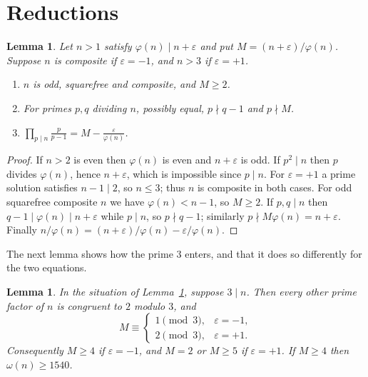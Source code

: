 \documentclass[screen,reqno]{aomart}
\numberwithin{equation}{section}
\theoremstyle{plain}
\newtheorem{lemma}[theorem]{Lemma}
\theoremstyle{definition}
\theoremstyle{remark}
\begin{document}
\section{Reductions}\label{sec:elem}

\begin{lemma}\label{lem:basic}
Let $n>1$ satisfy $\varphi(n)\mid n+\varepsilon$ and put
$M=(n+\varepsilon)/\varphi(n)$. Suppose $n$ is composite if
$\varepsilon=-1$, and $n>3$ if $\varepsilon=+1$.
\begin{enumerate}[label=\textup{(\roman*)}]
\item $n$ is odd, squarefree and composite, and $M\ge2$.
\item For primes $p,q$ dividing $n$, possibly equal, $p\nmid q-1$ and
  $p\nmid M$.
\item $\displaystyle\prod_{p\mid n}\frac{p}{p-1}
  =M-\frac{\varepsilon}{\varphi(n)}$.
\end{enumerate}
\end{lemma}

\begin{proof}
If $n>2$ is even then $\varphi(n)$ is even and $n+\varepsilon$ is odd.
If $p^2\mid n$ then $p$ divides $\varphi(n)$, hence $n+\varepsilon$,
which is impossible since $p\mid n$. For $\varepsilon=+1$ a prime
solution satisfies $n-1\mid2$, so $n\le3$; thus $n$ is composite in
both cases. For odd squarefree composite $n$ we have
$\varphi(n)<n-1$, so $M\ge2$. If $p,q\mid n$ then
$q-1\mid\varphi(n)\mid n+\varepsilon$ while $p\mid n$, so
$p\nmid q-1$; similarly $p\nmid M\varphi(n)=n+\varepsilon$. Finally
$n/\varphi(n)=(n+\varepsilon)/\varphi(n)-\varepsilon/\varphi(n)$.
\end{proof}

The next lemma shows how the prime $3$ enters, and that it does so
differently for the two equations.

\begin{lemma}\label{lem:three}
In the situation of Lemma~\ref{lem:basic}, suppose $3\mid n$. Then
every other prime factor of $n$ is congruent to $2$ modulo $3$, and
\[
  M\equiv\begin{cases}1\pmod3,&\varepsilon=-1,\\
  2\pmod3,&\varepsilon=+1.\end{cases}
\]
Consequently $M\ge4$ if $\varepsilon=-1$, and $M=2$ or $M\ge5$ if
$\varepsilon=+1$. If $M\ge4$ then $\omega(n)\ge1540$.
\end{lemma}
\end{document}
